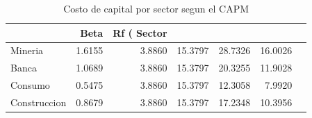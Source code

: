 \begin{table}
\caption{Costo de capital por sector segun el CAPM}
\label{tab:tabla5_costo_capital}
\begin{tabular}{lrrrrr}
\toprule
 & Beta & Rf (%
Sector &  &  &  &  &  \\
\midrule
Mineria & 1.6155 & 3.8860 & 15.3797 & 28.7326 & 16.0026 \\
Banca & 1.0689 & 3.8860 & 15.3797 & 20.3255 & 11.9028 \\
Consumo & 0.5475 & 3.8860 & 15.3797 & 12.3058 & 7.9920 \\
Construccion & 0.8679 & 3.8860 & 15.3797 & 17.2348 & 10.3956 \\
\bottomrule
\end{tabular}
\end{table}
